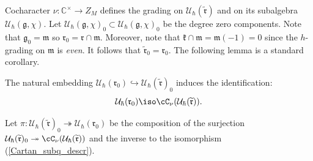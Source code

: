 \documentclass[12pt]{amsart}
\begin{document}
 Cocharacter $\nu\colon \mathbb{C}^\times \rightarrow Z_M$ defines the grading on $\mathcal{U}_{\hbar}(\widetilde{\mathfrak{r}})$ and on its subalgebra $\mathcal{U}_{\hbar}(\mathfrak{g},\chi)$. Let $\mathcal{U}_{\hbar}(\mathfrak{g},\chi)_0 \subset \mathcal{U}_{\hbar}(\mathfrak{g},\chi)_0$ be the degree zero components. Note that $\mathfrak{g}_0 = \mathfrak{m}$ so $\mathfrak{r}_0 = \mathfrak{r} \cap \mathfrak{m}$. Moreover, note that $\mathfrak{k} \cap \mathfrak{m} = \mathfrak{m}(-1) = 0$ since the $h$-grading on $\mathfrak{m}$ is {\emph{even}}. It follows that $\widetilde{\mathfrak{r}}_0 = \mathfrak{r}_0$. The following lemma is a standard corollary.


\begin{lemma}
The natural embedding $\mathcal{U}_\hbar(\mathfrak{r}_0) \hookrightarrow \mathcal{U}_\hbar(\widetilde{\mathfrak{r}})_0$ induces the identification: 
\begin{equation}\label{Cartan_subq_descr}
\mathcal{U}_\hbar(\mathfrak{r}_0) \iso \cC_\nu(\mathcal{U}_\hbar(\widetilde{\mathfrak{r}})).
\end{equation}
\end{lemma}

Let $\pi\colon \mathcal{U}_\hbar(\widetilde{\mathfrak{r}})_0 \twoheadrightarrow \mathcal{U}_\hbar(\mathfrak{r}_0)$ be the composition of the surjection $\mathcal{U}_\hbar(\widetilde{\mathfrak{r}})_0 \twoheadrightarrow \cC_\nu(\mathcal{U}_\hbar(\widetilde{\mathfrak{r}}))$ and the inverse to the isomorphism (\ref{Cartan_subq_descr}).
\end{document}

